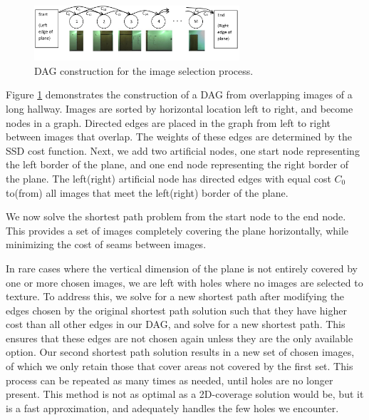 \documentclass[10pt,twocolumn,letterpaper]{article}
\begin{document}
\begin{figure}
  \centering
  \includegraphics[width=3in]{dagCreation.pdf}
  \caption{DAG construction for the image selection process.}
  \label{fig:dagCreation}
\end{figure}

Figure \ref{fig:dagCreation} demonstrates the construction of a DAG
from overlapping images of a long hallway. Images are sorted by
horizontal location left to right, and become nodes in a
graph. Directed edges are placed in the graph from left to right
between images that overlap. The weights of these edges are determined
by the SSD cost function. Next, we add two artificial nodes, one start
node representing the left border of the plane, and one end node
representing the right border of the plane. The left(right) artificial
node has directed edges with equal cost $C_0$ to(from) all images that
meet the left(right) border of the plane.

We now solve the shortest path problem from the start node to the end
node. This provides a set of images completely covering the plane
horizontally, while minimizing the cost of seams between images.

In rare cases where the vertical dimension of the plane is not
entirely covered by one or more chosen images, we are left with holes
where no images are selected to texture. To address this, we solve for
a new shortest path after modifying the edges chosen by the original
shortest path solution such that they have higher cost than all other
edges in our DAG, and solve for a new shortest path. This ensures that
these edges are not chosen again unless they are the only available
option. Our second shortest path solution results in a new set of
chosen images, of which we only retain those that cover areas not
covered by the first set. This process can be repeated as many times
as needed, until holes are no longer present. This method is not as
optimal as a 2D-coverage solution would be, but it is a fast
approximation, and adequately handles the few holes we encounter.
\end{document}
